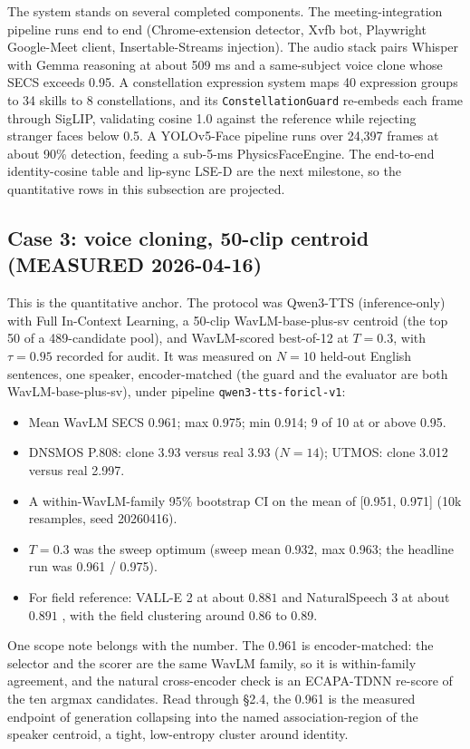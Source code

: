 \documentclass[10pt,twocolumn]{article}
\begin{document}
The system stands on several completed components. The meeting-integration pipeline
runs end to end (Chrome-extension detector, Xvfb bot, Playwright Google-Meet
client, Insertable-Streams injection). The audio stack pairs Whisper with Gemma
reasoning at about 509 ms and a same-subject voice clone whose SECS exceeds 0.95. A
constellation expression system maps 40 expression groups to 34 skills to 8
constellations, and its \texttt{ConstellationGuard} re-embeds each frame through
SigLIP, validating cosine 1.0 against the reference while rejecting stranger faces
below 0.5. A YOLOv5-Face pipeline runs over 24{,}397 frames at about 90\% detection,
feeding a sub-5-ms PhysicsFaceEngine. The end-to-end identity-cosine table and
lip-sync LSE-D are the next milestone, so the quantitative rows in this subsection
are projected.

\subsection{Case 3: voice cloning, 50-clip centroid (MEASURED 2026-04-16)}
This is the quantitative anchor. The protocol was Qwen3-TTS (inference-only) with
Full In-Context Learning, a 50-clip WavLM-base-plus-sv centroid (the top 50 of a
489-candidate pool), and WavLM-scored best-of-12 at $T=0.3$, with $\tau=0.95$
recorded for audit. It was measured on $N=10$ held-out English sentences, one
speaker, encoder-matched (the guard and the evaluator are both
WavLM-base-plus-sv), under pipeline \texttt{qwen3-tts-foricl-v1}:
\begin{itemize}\itemsep0.1em
\item Mean WavLM SECS 0.961; max 0.975; min 0.914; 9 of 10 at or above 0.95.
\item DNSMOS P.808: clone 3.93 versus real 3.93 ($N=14$); UTMOS: clone 3.012
versus real 2.997.
\item A within-WavLM-family 95\% bootstrap CI on the mean of [0.951, 0.971] (10k
resamples, seed 20260416).
\item $T=0.3$ was the sweep optimum (sweep mean 0.932, max 0.963; the headline run
was 0.961 / 0.975).
\item For field reference: VALL-E 2 at about $0.881$ \citep{chen2024valle2} and
NaturalSpeech 3 at about $0.891$ \citep{ju2024naturalspeech3}, with the field
clustering around 0.86 to 0.89.
\end{itemize}
One scope note belongs with the number. The 0.961 is encoder-matched: the selector
and the scorer are the same WavLM family, so it is within-family agreement, and the
natural cross-encoder check is an ECAPA-TDNN \citep{desplanques2020ecapa} re-score
of the ten argmax candidates. Read through \S2.4, the 0.961 is the measured
endpoint of generation collapsing into the named association-region of the speaker
centroid, a tight, low-entropy cluster around identity.
\end{document}
